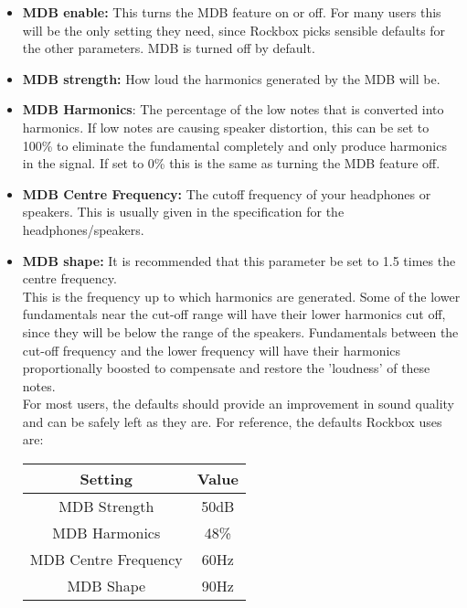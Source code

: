 \begin{itemize}
\begin{itemize}
\item \textbf{MDB enable: } This turns the MDB feature on or off.  For many
users this will be the only setting they need, since Rockbox picks
sensible defaults for the other parameters.  MDB is turned off by
default.
\item \textbf{MDB strength:} How loud the harmonics generated by the MDB will
be.
\item \textbf{MDB Harmonics}: The percentage of the low notes that is
converted into harmonics.  If low notes are causing speaker distortion,
this can be set to 100\% to eliminate the fundamental completely and
only produce harmonics in the signal.  If set to 0\% this is the same
as turning the MDB feature off.
\item \textbf{MDB Centre Frequency: }The cutoff frequency of your headphones or speakers.  This is usually given in the specification for the headphones/speakers.
\item \textbf{MDB shape: }It is recommended that this parameter be set to 1.5
times the centre frequency.\\

This is the frequency up to which harmonics are generated.  Some of the
lower fundamentals near the cut{}-off range
will have their lower harmonics cut off, since they will be below the
range of the speakers. Fundamentals between the
cut{}-off frequency and the lower frequency will have their harmonics proportionally boosted to compensate and restore the 'loudness' of these
notes.\\

For most users, the defaults should provide an improvement in sound
quality and can be safely left as they are.  For reference, the
defaults Rockbox uses are:


\begin{table}[h!]
  \begin{center}
    \begin{tabular}{|c|c|}
      \hline
      Setting & Value \\\hline
      MDB Strength & 50dB \\\hline
      MDB Harmonics & 48\% \\\hline
      MDB Centre Frequency & 60Hz \\\hline
      MDB Shape & 90Hz \\\hline
    \end{tabular}
  \end{center}
\end{table}

\end{itemize}
\end{itemize}

